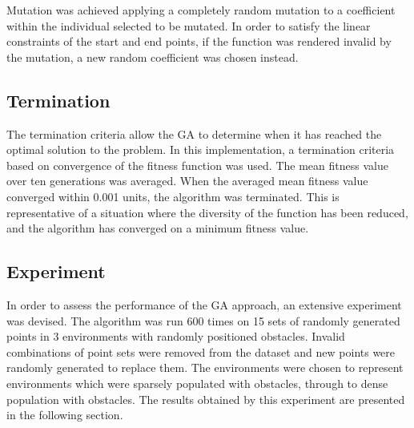 Mutation was achieved applying a completely random mutation to a coefficient within the individual selected to be mutated. In order to satisfy the linear constraints of the start and end points, if the function was rendered invalid by the mutation, a new random coefficient was chosen instead.

\subsection{Termination}
The termination criteria allow the GA to determine when it has reached the optimal solution to the problem. In this implementation, a termination criteria based on convergence of the fitness function was used. The mean fitness value over ten generations was averaged. When the averaged mean fitness value converged within 0.001 units, the algorithm was terminated. This is representative of a situation where the diversity of the function has been reduced, and the algorithm has converged on a minimum fitness value.

\subsection{Experiment} \label{sec:experiment}
In order to assess the performance of the GA approach, an extensive experiment was devised. The algorithm was run 600 times on 15 sets of randomly generated points in 3 environments with randomly positioned obstacles. Invalid combinations of point sets were removed from the dataset and new points were randomly generated to replace them. The environments were chosen to represent environments which were sparsely populated with obstacles, through to dense population with obstacles. The results obtained by this experiment are presented in the following section.